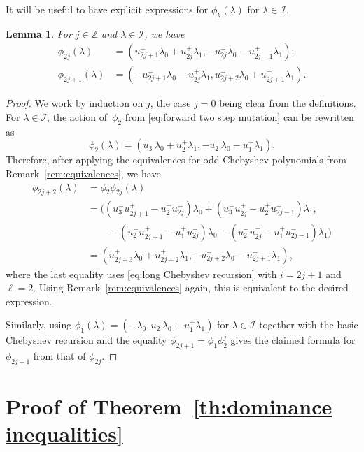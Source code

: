 \documentclass[pdflatex,sn-mathphys]{sn-jnl}%
\theoremstyle{thmstyleone}%
\newtheorem{lemma}[theorem]{Lemma}
\theoremstyle{thmstyletwo}%
\theoremstyle{thmstylethree}%
\newcommand{\cI}{\mathcal{I}}
\newcommand{\ZZ}{\mathbb{Z}}
\begin{document}
  It will be useful to have explicit expressions for $\phi_k(\lambda)$ for $\lambda\in\cI$.
  \begin{lemma}
    \label{le:imaginary transformations}
    For $j\in\ZZ$ and $\lambda\in\cI$, we have
    \begin{align*}
      \phi_{2j}(\lambda)&=(u_{2j+1}^-\lambda_0+u_{2j}^+\lambda_1,-u_{2j}^-\lambda_0-u_{2j-1}^+\lambda_1);\\
      \phi_{2j+1}(\lambda)&=(-u_{2j+1}^-\lambda_0-u_{2j}^+\lambda_1,u_{2j+2}^-\lambda_0+u_{2j+1}^+\lambda_1).
    \end{align*}
  \end{lemma}
  \begin{proof}
    We work by induction on $j$, the case $j=0$ being clear from the definitions.
    For $\lambda\in\cI$, the action of~$\phi_2$ from \eqref{eq:forward two step mutation} can be rewritten as
    \[\phi_2(\lambda)=(u_3^-\lambda_0+u_2^+\lambda_1,-u_2^-\lambda_0-u_1^+\lambda_1).\]
    Therefore, after applying the equivalences for odd Chebyshev polynomials from Remark~\ref{rem:equivalences}, we have
    \begin{align*}
      \phi_{2j+2}(\lambda)&=\phi_2\phi_{2j}(\lambda)\\
      &=\Big( (u_3^- u_{2j+1}^+-u_2^+u_{2j}^-)\lambda_0+(u_3^-u_{2j}^+-u_2^+u_{2j-1}^-)\lambda_1,\\
      &\qquad-(u_2^-u_{2j+1}^+-u_1^+u_{2j}^-)\lambda_0-(u_2^-u_{2j}^+-u_1^+u_{2j-1}^-)\lambda_1 \Big)\\
      &=(u_{2j+3}^+\lambda_0+u_{2j+2}^+\lambda_1, -u_{2j+2}^-\lambda_0-u_{2j+1}^-\lambda_1),
    \end{align*}
    where the last equality uses \eqref{eq:long Chebyshev recursion} with $i=2j+1$ and $\ell=2$.
    Using Remark~\ref{rem:equivalences} again, this is equivalent to the desired expression.

    Similarly, using $\phi_1(\lambda)=(-\lambda_0,u_2^-\lambda_0+u_1^+\lambda_1)$ for $\lambda\in\cI$ together with the basic Chebyshev recursion and the equality $\phi_{2j+1}=\phi_1\phi_2^j$ gives the claimed formula for $\phi_{2j+1}$ from that of $\phi_{2j}$.
  \end{proof}


\section{Proof of Theorem~\ref{th:dominance inequalities}}
\label{sec:dominance inequalities}
\end{document}
